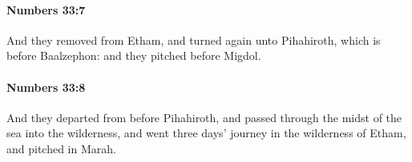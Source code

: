 		\paragraph{Numbers 33:7} %
			\label{NUMBERS-33-7}

			And they removed from Etham, and turned again unto Pihahiroth, which is before Baalzephon: and they pitched before Migdol.


		\paragraph{Numbers 33:8} %
			\label{NUMBERS-33-8}

			And they departed from before Pihahiroth, and passed through the midst of the sea into the wilderness, and went three days’ journey in the wilderness of Etham, and pitched in Marah.



